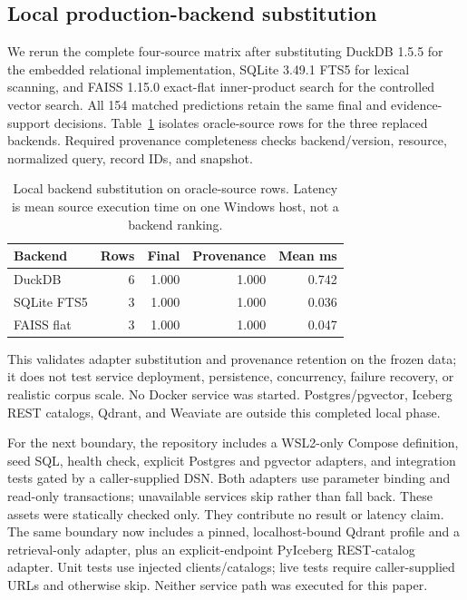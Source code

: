 \documentclass[11pt]{article}
\begin{document}
\subsection{Local production-backend substitution}
We rerun the complete four-source matrix after substituting DuckDB 1.5.5 for the
embedded relational implementation, SQLite 3.49.1 FTS5 for lexical scanning, and
FAISS 1.15.0 exact-flat inner-product search for the controlled vector search.
All 154 matched predictions retain the same final and evidence-support decisions.
Table~\ref{tab:p25-production} isolates oracle-source rows for the three replaced
backends. Required provenance completeness checks backend/version, resource,
normalized query, record IDs, and snapshot.

\begin{table}[t]
\centering\small
\caption{Local backend substitution on oracle-source rows. Latency is mean
source execution time on one Windows host, not a backend ranking.}
\label{tab:p25-production}
\begin{tabular}{lrrrr}
\toprule
Backend & Rows & Final & Provenance & Mean ms\\
\midrule
DuckDB & 6 & 1.000 & 1.000 & 0.742\\
SQLite FTS5 & 3 & 1.000 & 1.000 & 0.036\\
FAISS flat & 3 & 1.000 & 1.000 & 0.047\\
\bottomrule
\end{tabular}
\end{table}

This validates adapter substitution and provenance retention on the frozen data;
it does not test service deployment, persistence, concurrency, failure recovery,
or realistic corpus scale. No Docker service was started. Postgres/pgvector,
Iceberg REST catalogs, Qdrant, and Weaviate are outside this completed local
phase.

For the next boundary, the repository includes a WSL2-only Compose definition,
seed SQL, health check, explicit Postgres and pgvector adapters, and integration
tests gated by a caller-supplied DSN. Both adapters use parameter binding and
read-only transactions; unavailable services skip rather than fall back. These
assets were statically checked only. They contribute no result or latency claim.
The same boundary now includes a pinned, localhost-bound Qdrant profile and a
retrieval-only adapter, plus an explicit-endpoint PyIceberg REST-catalog adapter.
Unit tests use injected clients/catalogs; live tests require caller-supplied URLs
and otherwise skip. Neither service path was executed for this paper.
\end{document}
